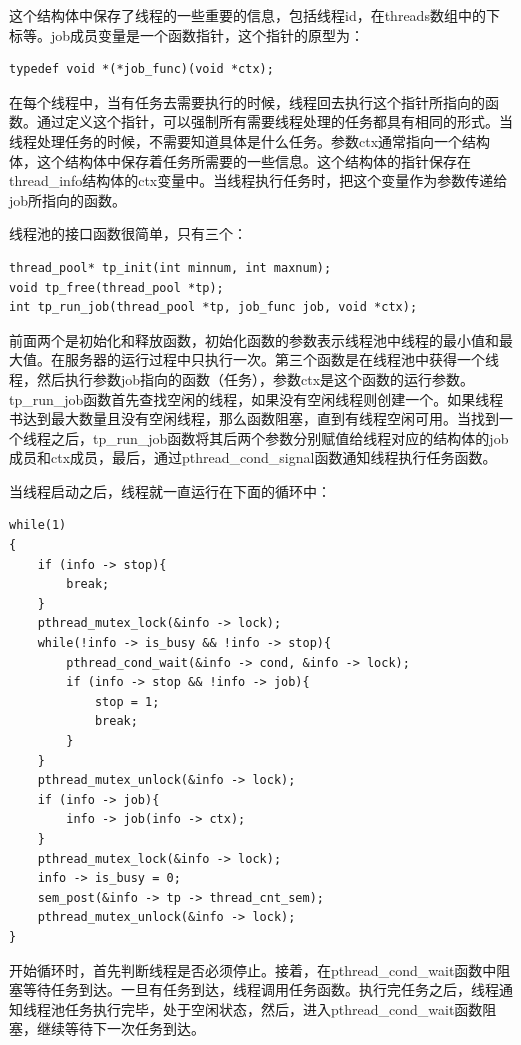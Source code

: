 \documentclass[twoside, xetex]{report}
\begin{document}
	这个结构体中保存了线程的一些重要的信息，包括线程id，在threads数组中的下标等。job成员变量是一个函数指针，这个指针的原型为：
\begin{lstlisting}
typedef void *(*job_func)(void *ctx); 
\end{lstlisting}

	在每个线程中，当有任务去需要执行的时候，线程回去执行这个指针所指向的函数。通过定义这个指针，可以强制所有需要线程处理的任务都具有相同的形式。当线程处理任务的时候，不需要知道具体是什么任务。参数ctx通常指向一个结构体，这个结构体中保存着任务所需要的一些信息。这个结构体的指针保存在thread\_info结构体的ctx变量中。当线程执行任务时，把这个变量作为参数传递给job所指向的函数。
	
	线程池的接口函数很简单，只有三个：
\begin{lstlisting}
thread_pool* tp_init(int minnum, int maxnum);
void tp_free(thread_pool *tp);
int tp_run_job(thread_pool *tp, job_func job, void *ctx);
\end{lstlisting}

	前面两个是初始化和释放函数，初始化函数的参数表示线程池中线程的最小值和最大值。在服务器的运行过程中只执行一次。第三个函数是在线程池中获得一个线程，然后执行参数job指向的函数（任务），参数ctx是这个函数的运行参数。tp\_run\_job函数首先查找空闲的线程，如果没有空闲线程则创建一个。如果线程书达到最大数量且没有空闲线程，那么函数阻塞，直到有线程空闲可用。当找到一个线程之后，tp\_run\_job函数将其后两个参数分别赋值给线程对应的结构体的job成员和ctx成员，最后，通过pthread\_cond\_signal函数通知线程执行任务函数。
	
	当线程启动之后，线程就一直运行在下面的循环中：
\begin{lstlisting}
while(1)
{
	if (info -> stop){
		break;
	}
	pthread_mutex_lock(&info -> lock);
	while(!info -> is_busy && !info -> stop){
		pthread_cond_wait(&info -> cond, &info -> lock);
		if (info -> stop && !info -> job){
			stop = 1;
			break;
		}
	}
	pthread_mutex_unlock(&info -> lock);
	if (info -> job){
		info -> job(info -> ctx);
	}
	pthread_mutex_lock(&info -> lock);
	info -> is_busy = 0;
	sem_post(&info -> tp -> thread_cnt_sem);
	pthread_mutex_unlock(&info -> lock);
}
\end{lstlisting}

	开始循环时，首先判断线程是否必须停止。接着，在pthread\_cond\_wait函数中阻塞等待任务到达。一旦有任务到达，线程调用任务函数。执行完任务之后，线程通知线程池任务执行完毕，处于空闲状态，然后，进入pthread\_cond\_wait函数阻塞，继续等待下一次任务到达。
	
\end{document}
